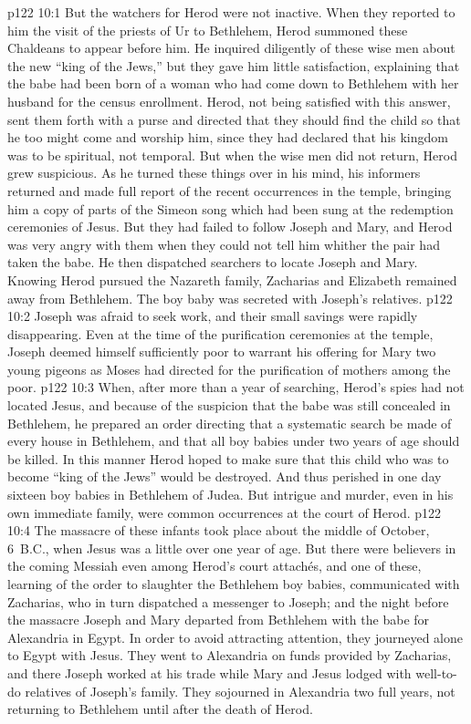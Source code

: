 \vs p122 10:1 But the watchers for Herod were not inactive. When they reported to him the visit of the priests of Ur to Bethlehem, Herod summoned these Chaldeans to appear before him. He inquired diligently of these wise men about the new “king of the Jews,” but they gave him little satisfaction, explaining that the babe had been born of a woman who had come down to Bethlehem with her husband for the census enrollment. Herod, not being satisfied with this answer, sent them forth with a purse and directed that they should find the child so that he too might come and worship him, since they had declared that his kingdom was to be spiritual, not temporal. But when the wise men did not return, Herod grew suspicious. As he turned these things over in his mind, his informers returned and made full report of the recent occurrences in the temple, bringing him a copy of parts of the Simeon song which had been sung at the redemption ceremonies of Jesus. But they had failed to follow Joseph and Mary, and Herod was very angry with them when they could not tell him whither the pair had taken the babe. He then dispatched searchers to locate Joseph and Mary. Knowing Herod pursued the Nazareth family, Zacharias and Elizabeth remained away from Bethlehem. The boy baby was secreted with Joseph’s relatives.
\vs p122 10:2 Joseph was afraid to seek work, and their small savings were rapidly disappearing. Even at the time of the purification ceremonies at the temple, Joseph deemed himself sufficiently poor to warrant his offering for Mary two young pigeons as Moses had directed for the purification of mothers among the poor.
\vs p122 10:3 When, after more than a year of searching, Herod’s spies had not located Jesus, and because of the suspicion that the babe was still concealed in Bethlehem, he prepared an order directing that a systematic search be made of every house in Bethlehem, and that all boy babies under two years of age should be killed. In this manner Herod hoped to make sure that this child who was to become “king of the Jews” would be destroyed. And thus perished in one day sixteen boy babies in Bethlehem of Judea. But intrigue and murder, even in his own immediate family, were common occurrences at the court of Herod.
\vs p122 10:4 The massacre of these infants took place about the middle of October, 6~B.C., when Jesus was a little over one year of age. But there were believers in the coming Messiah even among Herod’s court attachés, and one of these, learning of the order to slaughter the Bethlehem boy babies, communicated with Zacharias, who in turn dispatched a messenger to Joseph; and the night before the massacre Joseph and Mary departed from Bethlehem with the babe for Alexandria in Egypt. In order to avoid attracting attention, they journeyed alone to Egypt with Jesus. They went to Alexandria on funds provided by Zacharias, and there Joseph worked at his trade while Mary and Jesus lodged with well\hyp{}to\hyp{}do relatives of Joseph’s family. They sojourned in Alexandria two full years, not returning to Bethlehem until after the death of Herod.
